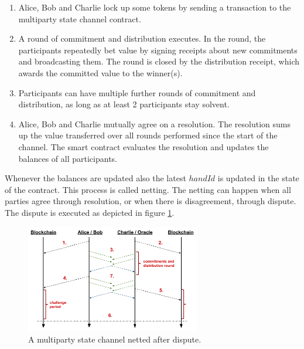 \begin{enumerate}
\item Alice, Bob and Charlie lock up some tokens by sending a transaction to the multiparty state channel contract.
\item A round of commitment and distribution executes. In the round, the participants repeatedly bet value by signing receipts about new commitments and broadcasting them. The round is  closed by the distribution receipt, which awards the committed value to the winner(s).
\item Participants can have multiple further rounds of commitment and distribution, as long as at least 2 participants stay solvent.
\item Alice, Bob and Charlie mutually agree on a resolution. The resolution sums up the value transferred over all rounds performed since the start of the channel. The smart contract evaluates the resolution and updates the balances of all participants. 
\end{enumerate}

Whenever the balances are updated also the latest \(handId\) is updated in the state of the contract. This process is called netting. The netting can happen when all parties agree through resolution, or when there is disagreement, through dispute. The dispute is executed as depicted in figure \ref{mpc_dispute}.

\begin{figure}[!ht]
\centering
\includegraphics[width=3.0in]{images/multiDispute.png}
\caption{A multiparty state channel netted after dispute.}
\label{mpc_dispute}
\end{figure}


